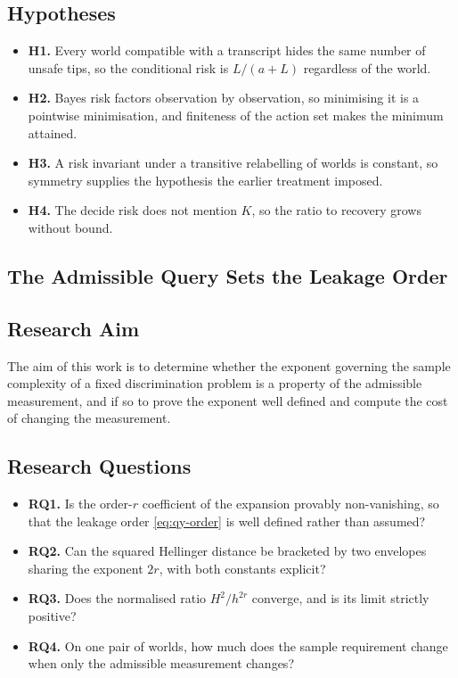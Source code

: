 \subsection{Hypotheses}

\begin{itemize}
\item \textbf{H1.} Every world compatible with a transcript hides the same number of unsafe
tips, so the conditional risk is $L/(a+L)$ regardless of the world.
\item \textbf{H2.} Bayes risk factors observation by observation, so minimising it is a
pointwise minimisation, and finiteness of the action set makes the minimum attained.
\item \textbf{H3.} A risk invariant under a transitive relabelling of worlds is constant, so
symmetry supplies the hypothesis the earlier treatment imposed.
\item \textbf{H4.} The decide risk does not mention $K$, so the ratio to recovery grows
without bound.
\end{itemize}


\subsection{The Admissible Query Sets the Leakage Order}

\subsection{Research Aim}

The aim of this work is to determine whether the exponent governing the sample complexity of
a fixed discrimination problem is a property of the admissible measurement, and if so to
prove the exponent well defined and compute the cost of changing the measurement.

\subsection{Research Questions}

\begin{itemize}
\item \textbf{RQ1.} Is the order-$r$ coefficient of the expansion provably non-vanishing, so
that the leakage order \eqref{eq:qy-order} is well defined rather than assumed?
\item \textbf{RQ2.} Can the squared Hellinger distance be bracketed by two envelopes sharing
the exponent $2r$, with both constants explicit?
\item \textbf{RQ3.} Does the normalised ratio $H^{2}/h^{2r}$ converge, and is its limit
strictly positive?
\item \textbf{RQ4.} On one pair of worlds, how much does the sample requirement change when
only the admissible measurement changes?
\end{itemize}


